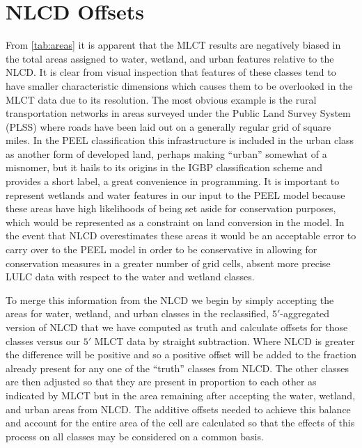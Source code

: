 \section{NLCD Offsets}
\label{sec:nlcd_offsets}


From \autoref{tab:areas} it is apparent that the MLCT results are
negatively biased in the total areas assigned to water, wetland, and
urban features relative to the NLCD.  It is clear from visual
inspection that features of these classes tend to have smaller
characteristic dimensions which causes them to be overlooked in the
MLCT data due to its resolution.  The most obvious example is the
rural transportation networks in areas surveyed under the Public Land
Survey System (PLSS) where roads have been laid out on a generally
regular grid of square miles.  In the PEEL classification this
infrastructure is included in the urban class as another form of
developed land, perhaps making ``urban'' somewhat of a misnomer, but
it hails to its origins in the IGBP classification scheme and provides
a short label, a great convenience in programming.  It is important to
represent wetlands and water features in our input to the PEEL model
because these areas have high likelihoods of being set aside for
conservation purposes, which would be represented as a constraint on
land conversion in the model.  In the event that NLCD overestimates
these areas it would be an acceptable error to carry over to the PEEL
model in order to be conservative in allowing for conservation
measures in a greater number of grid cells, absent more precise LULC
data with respect to the water and wetland classes.

To merge this information from the NLCD we begin by simply accepting
the areas for water, wetland, and urban classes in the reclassified,
$5'$-aggregated version of NLCD that we have computed as truth and
calculate offsets for those classes versus our $5'$ MLCT data by
straight subtraction.  Where NLCD is greater the difference will be
positive and so a positive offset will be added to the fraction
already present for any one of the ``truth'' classes from NLCD.  The
other classes are then adjusted so that they are present in proportion
to each other as indicated by MLCT but in the area remaining after
accepting the water, wetland, and urban areas from NLCD.  The additive
offsets needed to achieve this balance and account for the entire area
of the cell are calculated so that the effects of this process on all
classes may be considered on a common basis.  

